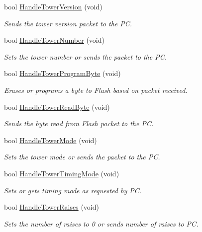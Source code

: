 \begin{DoxyCompactItemize}
bool \hyperlink{group__main__module_gac9c8611e6ca6e8101dc2c7f34e445d0a}{Handle\+Tower\+Version} (void)
\begin{DoxyCompactList}\small\item\em Sends the tower version packet to the P\+C. \end{DoxyCompactList}\item 
bool \hyperlink{group__main__module_ga48b1be0eab5f4af73fbac1aa4cecbf62}{Handle\+Tower\+Number} (void)
\begin{DoxyCompactList}\small\item\em Sets the tower number or sends the packet to the P\+C. \end{DoxyCompactList}\item 
bool \hyperlink{group__main__module_ga642f5c203b68dd5c5d902b32c7042f8c}{Handle\+Tower\+Program\+Byte} (void)
\begin{DoxyCompactList}\small\item\em Erases or programs a byte to Flash based on packet received. \end{DoxyCompactList}\item 
bool \hyperlink{group__main__module_ga34b9ab4cffb0154fedb4a8e56d6e5e36}{Handle\+Tower\+Read\+Byte} (void)
\begin{DoxyCompactList}\small\item\em Sends the byte read from Flash packet to the P\+C. \end{DoxyCompactList}\item 
bool \hyperlink{group__main__module_ga1731ffe6036a63b162d2efcac8f934c3}{Handle\+Tower\+Mode} (void)
\begin{DoxyCompactList}\small\item\em Sets the tower mode or sends the packet to the P\+C. \end{DoxyCompactList}\item 
bool \hyperlink{group__main__module_gacc6c91c0f930f047522cfe82edd54848}{Handle\+Tower\+Timing\+Mode} (void)
\begin{DoxyCompactList}\small\item\em Sets or gets timing mode as requested by P\+C. \end{DoxyCompactList}\item 
bool \hyperlink{group__main__module_gac9cd77b60838508770fa194f3a6bf518}{Handle\+Tower\+Raises} (void)
\begin{DoxyCompactList}\small\item\em Sets the number of raises to 0 or sends number of raises to P\+C. \end{DoxyCompactList}\item 

\end{DoxyCompactItemize}
